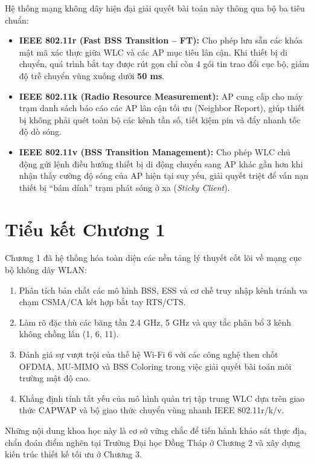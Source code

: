 Hệ thống mạng không dây hiện đại giải quyết bài toán này thông qua bộ ba tiêu chuẩn:
\begin{itemize}
    \item \textbf{IEEE 802.11r (Fast BSS Transition -- FT):} Cho phép lưu sẵn các khóa mật mã xác thực giữa WLC và các AP mục tiêu lân cận. Khi thiết bị di chuyển, quá trình bắt tay được rút gọn chỉ còn 4 gói tin trao đổi cục bộ, giảm độ trễ chuyển vùng xuống dưới \textbf{50 ms}.
    \item \textbf{IEEE 802.11k (Radio Resource Measurement):} AP cung cấp cho máy trạm danh sách báo cáo các AP lân cận tối ưu (Neighbor Report), giúp thiết bị không phải quét toàn bộ các kênh tần số, tiết kiệm pin và đẩy nhanh tốc độ dò sóng.
    \item \textbf{IEEE 802.11v (BSS Transition Management):} Cho phép WLC chủ động gửi lệnh điều hướng thiết bị di động chuyển sang AP khác gần hơn khi nhận thấy cường độ sóng của AP hiện tại suy yếu, giải quyết triệt để vấn nạn thiết bị ``bám dính'' trạm phát sóng ở xa (\textit{Sticky Client}).
\end{itemize}

\section{Tiểu kết Chương 1}

Chương 1 đã hệ thống hóa toàn diện các nền tảng lý thuyết cốt lõi về mạng cục bộ không dây WLAN:
\begin{enumerate}
    \item Phân tích bản chất các mô hình BSS, ESS và cơ chế truy nhập kênh tránh va chạm CSMA/CA kết hợp bắt tay RTS/CTS.
    \item Làm rõ đặc thù các băng tần 2.4 GHz, 5 GHz và quy tắc phân bổ 3 kênh không chồng lấn (1, 6, 11).
    \item Đánh giá sự vượt trội của thế hệ Wi-Fi 6 với các công nghệ then chốt OFDMA, MU-MIMO và BSS Coloring trong việc giải quyết bài toán môi trường mật độ cao.
    \item Khẳng định tính tất yếu của mô hình quản trị tập trung WLC dựa trên giao thức CAPWAP và bộ giao thức chuyển vùng nhanh IEEE 802.11r/k/v.
\end{enumerate}

Những nội dung khoa học này là cơ sở vững chắc để tiến hành khảo sát thực địa, chẩn đoán điểm nghẽn tại Trường Đại học Đồng Tháp ở Chương 2 và xây dựng kiến trúc thiết kế tối ưu ở Chương 3.
